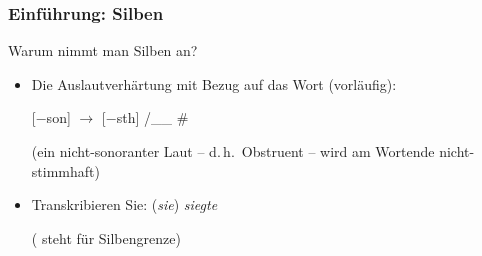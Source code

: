 \begin{frame}
\frametitle{Einführung: Silben}

Warum nimmt man Silben an?

\begin{itemize}
	\item Die Auslautverhärtung mit Bezug auf das Wort (vorläufig):
	
	\ea {}[$-$son] $\rightarrow$ [$-$sth] /\_\_ \#
             
	{\small (ein nicht-sonoranter Laut -- d.\,h.\ Obstruent -- wird am Wortende nicht-stimmhaft)}
	\z
     
	\item Transkribieren Sie: (\emph{sie}) \emph{siegte}

\pause	

	\ea
	\textipa{[zi:k . t@]} ( steht für Silbengrenze)
	\z

%
%        
\end{itemize}

\end{frame}


